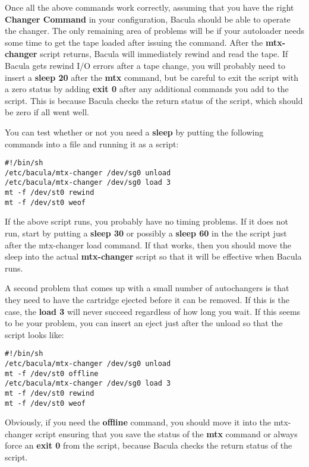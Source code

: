 Once all the above commands work correctly, assuming that you have the right
{\bf Changer Command} in your configuration, Bacula should be able to operate
the changer. The only remaining area of problems will be if your autoloader
needs some time to get the tape loaded after issuing the command. After the
{\bf mtx-changer} script returns, Bacula will immediately rewind and read the
tape. If Bacula gets rewind I/O errors after a tape change, you will probably
need to insert a {\bf sleep 20} after the {\bf mtx} command, but be careful to
exit the script with a zero status by adding {\bf exit 0} after any additional
commands you add to the script. This is because Bacula checks the return
status of the script, which should be zero if all went well. 

You can test whether or not you need a {\bf sleep} by putting the following
commands into a file and running it as a script: 

\footnotesize
\begin{verbatim}
#!/bin/sh
/etc/bacula/mtx-changer /dev/sg0 unload
/etc/bacula/mtx-changer /dev/sg0 load 3
mt -f /dev/st0 rewind
mt -f /dev/st0 weof
\end{verbatim}
\normalsize

If the above script runs, you probably have no timing problems. If it does not
run, start by putting a {\bf sleep 30} or possibly a {\bf sleep 60} in the the
script just after the mtx-changer load command. If that works, then you should
move the sleep into the actual {\bf mtx-changer} script so that it will be
effective when Bacula runs. 

A second problem that comes up with a small number of autochangers is that
they need to have the cartridge ejected before it can be removed. If this is
the case, the {\bf load 3} will never succeed regardless of how long you wait.
If this seems to be your problem, you can insert an eject just after the
unload so that the script looks like: 

\footnotesize
\begin{verbatim}
#!/bin/sh
/etc/bacula/mtx-changer /dev/sg0 unload
mt -f /dev/st0 offline
/etc/bacula/mtx-changer /dev/sg0 load 3
mt -f /dev/st0 rewind
mt -f /dev/st0 weof
\end{verbatim}
\normalsize

Obviously, if you need the {\bf offline} command, you should move it into the
mtx-changer script ensuring that you save the status of the {\bf mtx} command
or always force an {\bf exit 0} from the script, because Bacula checks the
return status of the script. 

